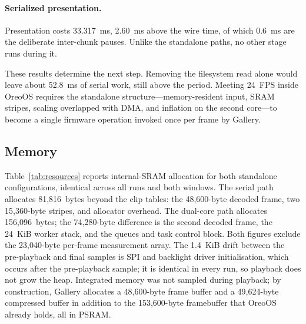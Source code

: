 \documentclass[11pt,twocolumn]{article}
\begin{document}
\paragraph{Serialized presentation.}  Presentation costs 33.317~ms, 2.60~ms
above the wire time, of which 0.6~ms are the deliberate inter-chunk pauses.
Unlike the standalone paths, no other stage runs during it.

These results determine the next step.  Removing the filesystem read alone
would leave about 52.8~ms of serial work, still above the period.  Meeting
24~FPS inside OreoOS requires the standalone structure---memory-resident
input, SRAM stripes, scaling overlapped with DMA, and inflation on the second
core---to become a single firmware operation invoked once per frame by
Gallery.

\subsection{Memory}

Table~\ref{tab:resources} reports internal-SRAM allocation for both
standalone configurations, identical across all runs and both windows.  The
serial path allocates 81,816~bytes beyond the clip tables: the 48,600-byte
decoded frame, two 15,360-byte stripes, and allocator overhead.  The
dual-core path allocates 156,096~bytes; the 74,280-byte difference is the
second decoded frame, the 24~KiB worker stack, and the queues and task
control block.  Both figures exclude the 23,040-byte per-frame measurement
array.  The 1.4~KiB drift between the pre-playback and final samples is SPI
and backlight driver initialisation, which occurs after the pre-playback
sample; it is identical in every run, so playback does not grow the heap.
Integrated memory was not sampled during playback; by construction, Gallery
allocates a 48,600-byte frame buffer and a 49,624-byte compressed buffer in
addition to the 153,600-byte framebuffer that OreoOS already holds, all in
PSRAM.

\begin{table}[t]
\centering
\caption{Measured standalone memory use (internal SRAM; identical in all ten
runs of both windows).}
\label{tab:resources}
\end{table}
\end{document}
